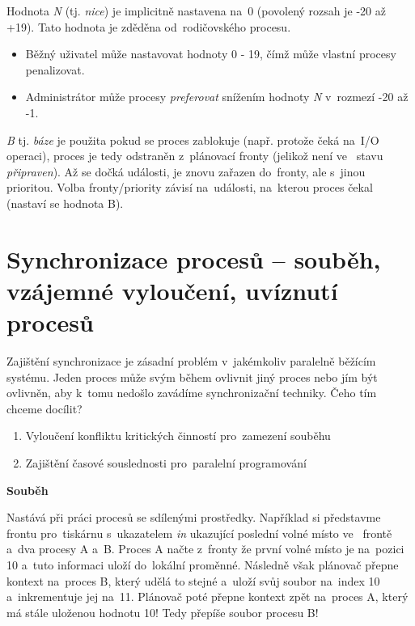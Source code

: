 \vspace{0,5cm}

Hodnota \emph{N} (tj. \emph{nice}) je implicitně nastavena na~0 (povolený rozsah je -20 až +19). Tato hodnota je zděděna od~rodičovského procesu.

\begin{itemize}
    \item Běžný uživatel může nastavovat hodnoty 0 - 19, čímž může vlastní procesy penalizovat.
    \item Administrátor může procesy \emph{preferovat} snížením hodnoty \emph{N} v~rozmezí -20 až -1.
\end{itemize}

\vspace{0,5cm}

\emph{B} tj. \emph{báze} je použita pokud se proces zablokuje (např. protože čeká na~I/O operaci), proces je tedy odstraněn z~plánovací fronty (jelikož není ve~ stavu \emph{připraven}). Až se dočká události, je znovu zařazen do~fronty, ale s~jinou prioritou. Volba fronty/priority závisí na~události, na~kterou proces čekal (nastaví se hodnota B).

\clearpage
\section{Synchronizace procesů -- souběh, vzájemné vyloučení, uvíznutí procesů} \label{sync}

Zajištění synchronizace je zásadní problém v~jakémkoliv paralelně běžícím systému. Jeden proces může svým během ovlivnit jiný proces nebo jím být ovlivněn, aby k~tomu nedošlo zavádíme synchronizační techniky. Čeho tím chceme docílit? 
\begin{enumerate}
    \item Vyloučení konfliktu kritických činností pro~zamezení souběhu
    \item Zajištění časové souslednosti pro~paralelní programování
\end{enumerate}

\begin{Large}
    \vspace{0,5cm}
    \textbf{Souběh}
\end{Large}

Nastává při práci procesů se sdílenými prostředky. Například si představme frontu pro~tiskárnu s~ukazatelem \emph{in} ukazující poslední volné místo ve~ frontě a~dva procesy A a~B. Proces A načte z~fronty že první volné místo je na~pozici 10 a~tuto informaci uloží do~lokální proměnné. Následně však plánovač přepne kontext na~proces B, který udělá to stejné a~uloží svůj soubor na~index 10 a~inkrementuje jej na~11. Plánovač poté přepne kontext zpět na~proces A, který má stále uloženou hodnotu 10! Tedy přepíše soubor procesu B! 


